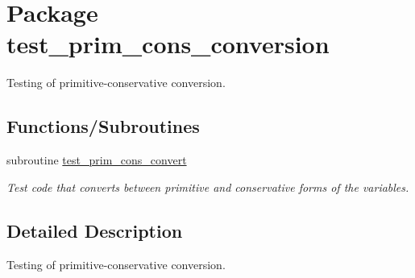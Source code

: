 \hypertarget{a00042}{
\section{Package test\_\-prim\_\-cons\_\-conversion}
\label{a00042}
}
Testing of primitive-conservative conversion.  


\subsection*{Functions/Subroutines}
\begin{CompactItemize}
\item 
\hypertarget{a00042_78d30a19666ba2d201b4bab74b7a927e}{
subroutine \hyperlink{a00042_78d30a19666ba2d201b4bab74b7a927e}{test\_\-prim\_\-cons\_\-convert}}
\label{a00042_78d30a19666ba2d201b4bab74b7a927e}

\begin{CompactList}\small\item\em Test code that converts between primitive and conservative forms of the variables. \item\end{CompactList}\end{CompactItemize}


\subsection{Detailed Description}
Testing of primitive-conservative conversion. 

